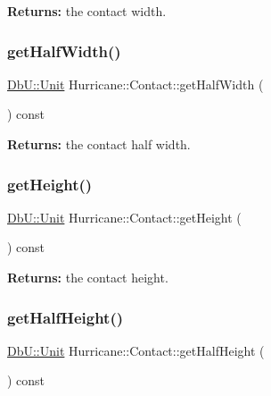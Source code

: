 {\bfseries Returns\+:} the contact width. \mbox{\label{classHurricane_1_1Contact_a4a5136f4e8299435e50db7da28172ca1}} 
\subsubsection{\texorpdfstring{get\+Half\+Width()}{getHalfWidth()}}
{\footnotesize\ttfamily \mbox{\hyperlink{group__DbUGroup_ga4fbfa3e8c89347af76c9628ea06c4146}{Db\+U\+::\+Unit}} Hurricane\+::\+Contact\+::get\+Half\+Width (\begin{DoxyParamCaption}{ }\end{DoxyParamCaption}) const\hspace{0.3cm}{\ttfamily [inline]}}

{\bfseries Returns\+:} the contact half width. \mbox{\label{classHurricane_1_1Contact_a07a4ecc7ea2479e2d63f5f31d9325dde}} 
\subsubsection{\texorpdfstring{get\+Height()}{getHeight()}}
{\footnotesize\ttfamily \mbox{\hyperlink{group__DbUGroup_ga4fbfa3e8c89347af76c9628ea06c4146}{Db\+U\+::\+Unit}} Hurricane\+::\+Contact\+::get\+Height (\begin{DoxyParamCaption}{ }\end{DoxyParamCaption}) const\hspace{0.3cm}{\ttfamily [inline]}}

{\bfseries Returns\+:} the contact height. \mbox{\label{classHurricane_1_1Contact_aebd3ff8e1368617ab750b20ae9ffb59b}} 
\subsubsection{\texorpdfstring{get\+Half\+Height()}{getHalfHeight()}}
{\footnotesize\ttfamily \mbox{\hyperlink{group__DbUGroup_ga4fbfa3e8c89347af76c9628ea06c4146}{Db\+U\+::\+Unit}} Hurricane\+::\+Contact\+::get\+Half\+Height (\begin{DoxyParamCaption}{ }\end{DoxyParamCaption}) const\hspace{0.3cm}{\ttfamily [inline]}}

